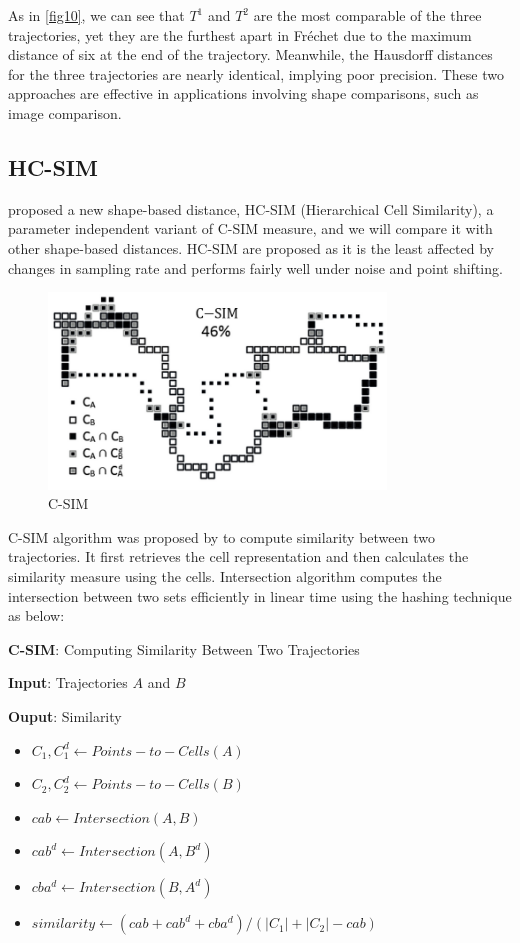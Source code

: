 \documentclass[a4paper, 12pt]{article}
\begin{document}
As in \autoref{fig10}, we can see that $T^1$ and $T^2$ are the most comparable of the three trajectories, yet they are the furthest apart in Fréchet due to the maximum distance of six at the end of the trajectory.
Meanwhile, the Hausdorff distances for the three trajectories are nearly identical, implying poor precision.
These two approaches are effective in applications involving shape comparisons, such as image comparison. 

\subsection{HC-SIM}
\cite{franti2019averaging} proposed a new shape-based distance, HC-SIM (Hierarchical Cell Similarity), a parameter independent variant of C-SIM measure, and we will compare it with other shape-based distances. HC-SIM are proposed as it is the least affected by changes in sampling rate and performs fairly well under noise and point shifting. 

\pagebreak

\begin{figure}[htbp!]
    \centering
    \includegraphics[width=0.8\textwidth]{csim.png}
    \caption{C-SIM}
\end{figure}

C-SIM algorithm was proposed by \cite{mariescu2017grid} to compute similarity between two trajectories. It first retrieves the cell representation and then calculates the similarity measure using the cells. Intersection algorithm computes the intersection between two sets efficiently in linear time using the hashing technique as below:

\textbf{C-SIM}: Computing Similarity Between Two Trajectories

\textbf{Input}: Trajectories $A$ and $B$

\textbf{Ouput}: Similarity

\begin{itemize}
    \item $C_{1}, C_{1}^d \leftarrow Points-to-Cells(A)$
    \item $C_{2}, C_{2}^d \leftarrow Points-to-Cells(B)$
    \item $cab \leftarrow Intersection(A, B)$
    \item $cab^d \leftarrow Intersection(A, B^d)$
    \item $cba^d \leftarrow Intersection(B, A^d)$
    \item $similarity \leftarrow (cab + cab^d + cba^d)/(|C_{1}| + |C_{2}| - cab)$
\end{itemize}
\end{document}
